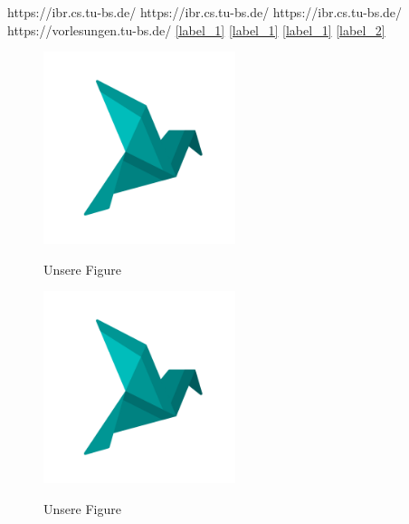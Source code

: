 %
%
%
\usepackage{graphicx}

https://ibr.cs.tu-bs.de/
https://ibr.cs.tu-bs.de/
https://ibr.cs.tu-bs.de/
https://vorlesungen.tu-bs.de/
\ref{label_1}
\ref{label_1}
\ref{label_1}
\ref{label_2}

\begin{figure}
    \centering
    \includegraphics[width=0.5\textwidth]{../assets/logomark.png}
    \label{logo}
    \caption{Unsere Figure}
\end{figure}

\begin{figure}
    \centering
    \includegraphics[width=0.5\textwidth]{../assets/logomark.png}
    \label{logo}
    \caption{Unsere Figure}
\end{figure}

